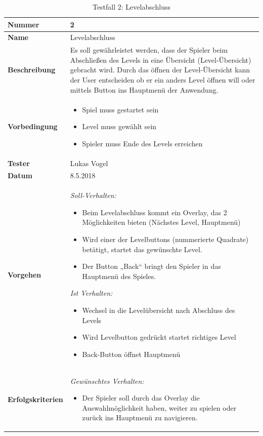 \begin{table}

	\renewcommand{\arraystretch}{1.5}
	\begin{tabular}{|p{3.5cm}|p{11cm}|}
		
		\hline 
		\textbf{Nummer} & 2 \\ 
		\hline 
		\textbf{Name} & {\large Levelabschluss} \\ 
		\hline 
		\textbf{Beschreibung} & 
		Es soll gewährleistet werden, dass der Spieler beim Abschließen des Levels in eine Übersicht (Level-Übersicht) gebracht wird. Durch das öffnen der Level-Übersicht kann der User entscheiden ob er ein anders Level öffnen will oder mittels Button ins Hauptmenü der Anwendung. \\ 
		\hline 
		\textbf{Vorbedingung} & 
		\begin{itemize}
			\setlength{\itemsep}{1pt}
			\setlength{\parskip}{0.5pt}
			\item Spiel muss gestartet sein
			\item Level muss gewählt sein
			\item Spieler muss Ende des Levels erreichen
		\end{itemize} \\ 
		\hline 
		\textbf{Tester} & Lukas Vogel \\ 
		\hline 
		\textbf{Datum} & 8.5.2018 \\ 
		\hline 
		\textbf{Vorgehen} & 
		\textit{Soll-Verhalten:}
		\begin{itemize}
			\setlength{\itemsep}{1pt}
			\setlength{\parskip}{0.5pt}
			\item Beim Levelabschluss kommt ein Overlay, das 2 Möglichkeiten bieten (Nächstes Level, Hauptmenü)
			\item Wird einer der Levelbuttons (nummerierte Quadrate) betätigt, startet das gewünschte Level. 
			\item Der Button „Back“ bringt den Spieler in das Hauptmenü des Spieles. \newline
		\end{itemize}  
		
		
		\textit{Ist Verhalten:}
		\begin{itemize}
			\setlength{\itemsep}{1pt}
			\setlength{\parskip}{0.5pt}
			\item Wechsel in die Levelübersicht nach Abschluss des Levels
			\item Wird Levelbutton gedrückt startet richtiges Level
			\item Back-Button öffnet Hauptmenü 
		\end{itemize}\\ 
		\hline 
		\textbf{Erfolgskriterien} & 
		\textit{Gewünschtes Verhalten:}
		\begin{itemize}
			\setlength{\itemsep}{1pt}
			\setlength{\parskip}{0.5pt}
			\item 	Der Spieler soll durch das Overlay die Auswahlmöglichkeit haben, weiter zu spielen oder zurück ins Hauptmenü zu navigieren.
		\end{itemize} \\ 
		\hline 
	\end{tabular} 
	\caption{Testfall 2: Levelabschluss}
\end{table}

